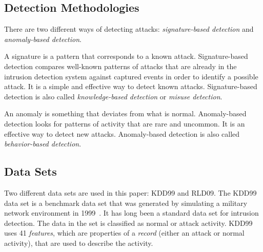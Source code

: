 \documentclass{sig-alternate}
\begin{document}
\subsection{Detection Methodologies}
\label{sec:detectionMeth}
There are two different ways of detecting attacks: \emph{signature-based detection} and \emph{anomaly-based detection}. 

A signature is a pattern that corresponds to a known attack. Signature-based detection compares well-known patterns of attacks that are already in the intrusion detection system against captured events in order to identify a possible attack. It is a simple and effective way to detect known attacks. Signature-based detection is also called \emph{knowledge-based detection} or \emph{misuse detection}.~\cite{Liao201316}

An anomaly is something that deviates from what is normal. Anomaly-based detection looks for patterns of activity that are rare and uncommon. It is an effective way to detect new attacks. Anomaly-based detection is also called \emph{behavior-based detection}.~\cite{DBLP:journals/corr/abs-1204-1336}




\subsection{Data Sets}
\label{sec:dataSets}
Two different data sets are used in this paper: KDD99 and RLD09. The KDD99 data set is a benchmark data set that was generated by simulating a military network environment in 1999~\cite{6559603}. It has long been a standard data set for intrusion detection. The data in the set is classified as normal or attack activity. KDD99 uses 41 \emph{features}, which are properties of a \emph{record} (either an attack or normal activity), that are used to describe the activity. 
\end{document}
